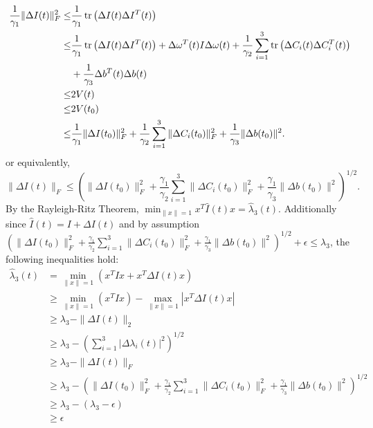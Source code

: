 \begin{align}
  \frac{1}{\gamma_1}\|\Delta I(t)\|_F^2
  \leq&\frac{1}{\gamma_1}\operatorname{tr}\left(\Delta I(t) \Delta I^T(t)\right)
  \nonumber \\
  \leq&\frac{1}{\gamma_1}\operatorname{tr}\left(\Delta I(t) \Delta I^T(t)\right) +
  \Delta \omega^T(t) I \Delta \omega (t)
       +\frac{1}{\gamma_2}\sum_{i=1}^3\operatorname{tr}\left(\Delta C_i(t) \Delta C_i^{T}(t)\right)
\nonumber \\
      & +\frac{1}{\gamma_3}\Delta b^T(t) \Delta b(t) 
\nonumber \\
   \leq&2 V(t)
\nonumber \\
   \leq&2 V(t_0)
\nonumber \\
   \leq&\frac{1}{\gamma_1}\|\Delta I(t_0)\|_F^2 +
        \frac{1}{\gamma_2}\sum_{i=1}^3 \|\Delta C_i(t_0)\|_F^2 + 
       \frac{1}{\gamma_3}\|\Delta b(t_0)\|^2.
\end{align}
%
or equivalently,
%
\begin{equation}
\|\Delta I(t)\|_F\leq\left(\|\Delta I(t_0)\|_F^2 +
        \frac{\gamma_1}{\gamma_2}\sum_{i=1}^3 \|\Delta C_i(t_0)\|_F^2 + 
       \frac{\gamma_1}{\gamma_3}\|\Delta b(t_0)\|^2\right)^{1/2}.
\end{equation}
%
By the Rayleigh-Ritz Theorem, $\min_{\|x\|=1}
x^T \hat{I}(t) x=\hat{\lambda}_3(t)$.  Additionally since
$\hat{I}(t)=I+\Delta I(t)$ and by assumption
%
$\left(\|\Delta I(t_0)\|_F^2 + \frac{\gamma_1}{\gamma_2}\sum_{i=1}^3
  \|\Delta C_i(t_0)\|_F^2 + \frac{\gamma_1}{\gamma_3}\|\Delta
  b(t_0)\|^2\right)^{1/2} +\epsilon\leq \lambda_3$,
%
the following inequalities hold:
%
\begin{align}
\hat{\lambda}_3(t)
 &= \min_{\|x\|=1}\left(x^T I x + x^T \Delta I(t) x\right)
\nonumber \\
 &\geq\min_{\|x\|=1}\left(x^T I x\right)-\max_{\|x\|=1}|x^T\Delta I(t)x|
\nonumber \\
 &\geq\lambda_3-\|\Delta I(t)\|_2
\nonumber \\
 &\geq\lambda_3-\left(\sum_{i=1}^3|\Delta\lambda_i(t)|^2\right)^{1/2}
\nonumber \\
 &\geq\lambda_3-\|\Delta I(t)\|_F
\nonumber \\
 &\geq\lambda_3-\left(\|\Delta I(t_0)\|_F^2 +
\frac{\gamma_1}{\gamma_2}\sum_{i=1}^3 \|\Delta C_i(t_0)\|_F^2
+\frac{\gamma_1}{\gamma_3}\|\Delta b(t_0)\|^2\right)^{1/2}
\nonumber \\
 &\geq\lambda_3-\left(\lambda_3-\epsilon\right)
\nonumber \\
 &\geq\epsilon
\end{align}

